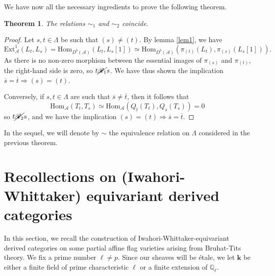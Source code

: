 \documentclass[11pt]{amsart}
\theoremstyle{plain}
\newtheorem{thm}{Theorem}[section]
\theoremstyle{remark}
\numberwithin{equation}{section}
\begin{document}
	We have now all the necessary ingredients to prove the following theorem.
	\begin{thm}\label{relations thm}
		The relations  $\sim_1$ and $\sim_2$ coincide.
	\end{thm}
	\begin{proof}
		Let $s,t\in\Lambda$ be such that $(s)\neq(t)$. By lemma \ref{lem1}, we have 
		$$\mathrm{Ext}_\mathcal{A}^1(L_{t},L_{s})=\mathrm{Hom}_{D^b(\mathcal{A})}(L_{t},L_{s}[1])\simeq \mathrm{Hom}_{D^b(\mathcal{A})}(\pi_{(t)}(L_{t}),\pi_{(s)}(L_{s}[1])).$$
		As there is no non-zero morphism between the essential images of $\pi_{(s)}$ and $\pi_{(t)}$, the right-hand side is zero, so $t\cancel{\mathscr{R}_1} s$. We have thus shown the implication $\overline{s}=\overline{t}\Rightarrow (s)=(t)$.
		
		Conversely, if $s,t\in\Lambda$ are such that $\overline{s}\neq\overline{t}$, then it follows that
		$$\mathrm{Hom}_\mathcal{A}(T_{t},T_{s})\simeq \mathrm{Hom}_\mathcal{A}(Q_{\overline{t}}(T_{t}),Q_{\overline{s}}(T_{s}))=0$$
		so $t\cancel{\mathscr{R}_2} s$, and we have the implication $(s)=(t)\Rightarrow  \overline{s}=\overline{t}$.
	\end{proof}
	In the sequel, we will denote by $\sim$ the equivalence relation on $\Lambda$ considered in the previous theorem.
	\section{Recollections on (Iwahori-Whittaker) equivariant derived categories}\label{Recollections on (Iwahori-Whittaker) equivariant derived categories}
	In this section, we recall the construction of Iwahori-Whittaker-equivariant derived categories on some partial affine flag varieties arising from Bruhat-Tits theory. We fix a prime number $\ell\neq p$. Since our sheaves will be \'etale, we let $\mathbf{k}$ be either a finite field of prime characteristic $\ell$ or a finite extension of $\mathbb{Q}_\ell$.
\end{document}
